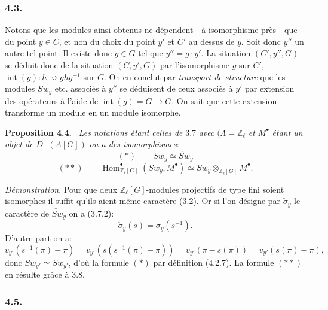 \documentclass[11pt]{article}
\newenvironment{statement}[1]{\par\medskip\noindent\textbf{#1.}\ }{\par\medskip}
\DeclareMathOperator{\Hom}{Hom}
\providecommand{\Hom}{\operatorname{Hom}}
\providecommand{\Hom}{\operatorname{Hom}}
\begin{document}
\subsubsection*{4.3.}

Notons que les modules ainsi obtenus ne dépendent - à isomorphisme près - que du point $y\in C$, et non du choix du point $y'$ et $C'$ au dessus de $y$. Soit donc $y''$ un autre tel point. Il existe donc $g\in G$ tel que $y''=g\cdot y'$. La situation $(C',y'',G)$ se déduit donc de la situation $(C,y',G)$ par l'isomorphisme $g$ sur $C'$, $\operatorname{int}(g):h\rightsquigarrow ghg^{-1}$ sur $G$. On en conclut par \emph{transport de structure} que les modules $Sw_y$ etc. associés à $y''$ se déduisent de ceux associés à $y'$ par extension des opérateurs à l'aide de $\operatorname{int}(g)=G\to G$. On sait que cette extension transforme un module en un module isomorphe.

\begin{statement}{Proposition 4.4}
\emph{Les notations étant celles de} 3.7 \emph{avec} $(\Lambda=\mathbb Z_\ell$ \emph{et} $M^\bullet$ \emph{étant un objet de} $D^+(A[G])$ \emph{on a des isomorphismes}:
\[
(*)\qquad Sw_y\simeq \check{Sw}_y
\]
\[
(**)\qquad
\Hom^\bullet_{\mathbb Z_\ell[G]}(Sw_y,M^\bullet)
\simeq Sw_y\otimes_{\mathbb Z_\ell[G]}M^\bullet.
\]
\end{statement}

\emph{Démonstration}. Pour que deux $\mathbb Z_\ell[G]$-modules projectifs de type fini soient isomorphes il suffit qu'ils aient même caractère (3.2). Or si l'on désigne par $\check\sigma_y$ le caractère de $\check{Sw}_y$ on a (3.7.2):
\[
\check\sigma_y(s)=\sigma_y(s^{-1}).
\]
D'autre part on a:
\[
v_{y'}(s^{-1}(\pi)-\pi)
=v_{y'}(s(s^{-1}(\pi)-\pi))
=v_{y'}(\pi-s(\pi))
=v_{y'}(s(\pi)-\pi),
\]
donc $Sw_{y'}\simeq Sw_{y'}$, d'où la formule $(*)$ par définition (4.2.7). La formule $(**)$ en résulte grâce à 3.8.

\subsubsection*{4.5.}
\end{document}

